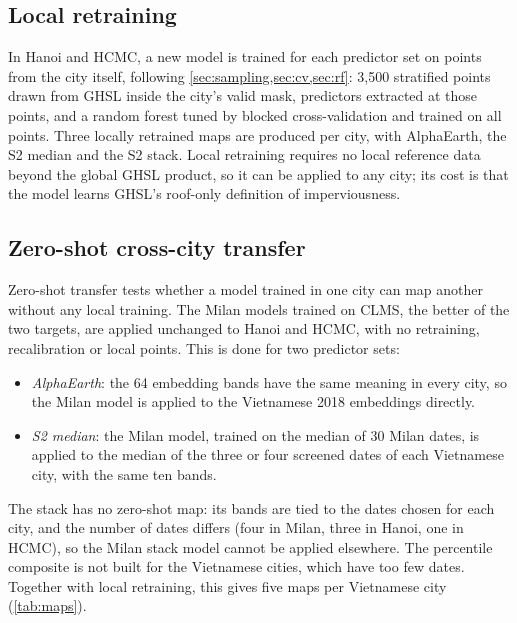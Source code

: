 \subsection{Local retraining}
\label{sec:local}

In Hanoi and HCMC, a new model is trained for each predictor set on points
from the city itself, following \cref{sec:sampling,sec:cv,sec:rf}: 3{,}500
stratified points drawn from GHSL inside the city's valid mask, predictors
extracted at those points, and a random forest tuned by blocked
cross-validation and trained on all points. Three locally retrained maps are
produced per city, with AlphaEarth, the S2 median and the S2 stack. Local
retraining requires no local reference data beyond the global GHSL product,
so it can be applied to any city; its cost is that the model learns GHSL's
roof-only definition of imperviousness.

\subsection{Zero-shot cross-city transfer}
\label{sec:zeroshot}

Zero-shot transfer tests whether a model trained in one city can map another
without any local training. The Milan models trained on CLMS, the better of
the two targets, are applied unchanged to Hanoi and HCMC, with no
retraining, recalibration or local points. This is done for two predictor
sets:

\begin{itemize}
  \item \emph{AlphaEarth}: the 64 embedding bands have the same meaning in
  every city, so the Milan model is applied to the Vietnamese 2018
  embeddings directly.
  \item \emph{S2 median}: the Milan model, trained on the median of 30 Milan
  dates, is applied to the median of the three or four screened dates of each
  Vietnamese city, with the same ten bands.
\end{itemize}

The stack has no zero-shot map: its bands are tied to the dates chosen for
each city, and the number of dates differs (four in Milan, three in Hanoi,
one in HCMC), so the Milan stack model cannot be applied elsewhere. The
percentile composite is not built for the Vietnamese cities, which have too
few dates. Together with local retraining, this gives five maps per
Vietnamese city (\cref{tab:maps}).

